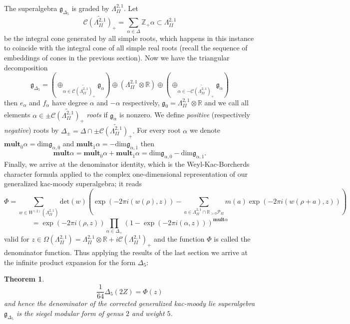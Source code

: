\documentclass[9pt]{amsart} \usepackage[utf8]{inputenc}
\newtheorem{theorem}{Theorem}
\newcommand{\Z}{\mathbb{Z}} \newcommand{\C}{\mathbb{C}}
\newcommand{\R}{\mathbb{R}} \newcommand{\La}{\Lambda}
\newcommand{\Cone}{\mathcal{C}}
\newcommand{\Poly}{\mathcal{P}}
\newcommand{\autcor}{\mathfrak{g}_{\Delta_5}}
\begin{document}
The superalgebra $\autcor$ is graded by
$\La^{2,1}_{II}$. Let $$\widetilde{\Cone(\La^{2,1}_{II})_+} =
\sum_{\alpha \in \Delta} \Z_+\alpha \subset \La^{2,1}_{II}$$ be the
integral cone generated by all simple roots, which happens in this
instance to coincide with the integral cone of all simple real roots
(recall the sequence of embeddings of cones in the previous section).
Now we have the triangular decomposition $$\autcor = (\oplus_{\alpha \in
\widetilde{\Cone(\La^{2,1}_{II})_+}} \mathfrak{g}_{\alpha}) \oplus
(\La^{2,1}_{II} \otimes \R) \oplus (\oplus_{\alpha \in
-\widetilde{\Cone(\La^{2,1}_{II})_+}} \mathfrak{g}_{\alpha})$$
 then $e_{\alpha}$ and $f_{\alpha}$ have degree
$\alpha$ and $-\alpha$ respectively, $\mathfrak{g}_0 = \La^{2,1}_{II}
\otimes \R$ and we call all elements $\alpha \in
\pm\widetilde{\Cone(\La^{2,1}_{II})_+}$ \textit{roots} if
$\mathfrak{g}_{\alpha}$ is nonzero. We define \textit{positive}
(respectively \textit{negative}) roots by $\Delta_{\pm} = \Delta \cap
\pm\widetilde{\Cone(\La^{2,1}_{II})_+}.$ For every root $\alpha$ we
denote $\textbf{mult}_{\overline{0}}\alpha =
\textrm{dim}\mathfrak{g}_{\alpha,\overline{0}}$ and
$\textbf{mult}_{\overline{1}}\alpha =
-\textrm{dim}\mathfrak{g}_{\alpha,\overline{1}}$ then
$$\textbf{mult}\alpha = \textbf{mult}_{\overline{0}}\alpha +
\textbf{mult}_{\overline{1}}\alpha = \textrm{dim}
\mathfrak{g}_{\alpha,\overline{0}} -
\textrm{dim}\mathfrak{g}_{\alpha,\overline{1}}.$$
Finally, we arrive at the denominator identity, which is the
Weyl-Kac-Borcherds character formula applied to the complex
one-dimensional representation of our generalized kac-moody
superalgebra; it reads $$\Phi = \sum_{w \in W^{(2)}(\La^{2,1}_{II})}
\text{det}(w)
(\exp(-2\pi i(w(\rho), z)) - \sum_{a\in \La^{2,1}_{II} \cap \R_{>0}
\Poly_{II}} m(a) \exp(-2\pi i(w(\rho + a), z)) ) $$ $$= \exp(-2\pi i(\rho,z))
\displaystyle\prod_{\alpha \in \Delta_+} (1 - \exp(-2\pi i
(\alpha,z)))^{\textbf{mult}\alpha}$$ valid for $z \in
\Omega(\La^{2,1}_{II}) = \La^{2,1}_{II} \otimes \R + i
\Cone(\La^{2,1}_{II})_+$ and the function $\Phi$ is called the
denominator function.  Thus applying the results of the last section we
arrive at the infinite product expansion for the form $\Delta_5$:

\begin{theorem}
  $$\frac{1}{64}\Delta_5(2Z) = \Phi(z)$$
  and hence the denominator of the \textit{corrected} generalized
  kac-moody lie superalgebra $\autcor$ is the
  siegel modular form of genus $2$ and weight $5$.
\end{theorem}
\end{document}
